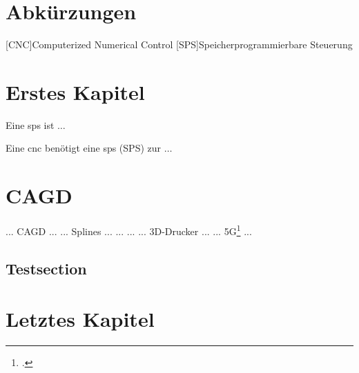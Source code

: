\documentclass[12pt,a4paper]{scrbook}
\begin{document}
\tableofcontents
\cleardoublepage

\listoffigures
\cleardoublepage

\listoftables
\cleardoublepage
 
\printnomenclature
\cleardoublepage
 

 
\chapter*{Abkürzungen}
\begin{acronym}
     [CNC]{Computerized Numerical Control}
     [SPS]{Speicherprogrammierbare Steuerung}
\end{acronym}
\cleardoublepage
 

\chapter{Erstes Kapitel}
Eine \ac{sps} ist $\ldots$

Eine \ac{cnc} benötigt eine \ac{sps}  (SPS)  zur $\ldots$

\chapter{CAGD}
... CAGD \cite{Farin2001} ...
... Splines ... \cite{DIN66025}
... \cite{Farouki2017} ...
... 3D-Drucker ... \cite{Patent3D}
... 5G\footcite{Zafeiropoulos2020} ...

\section{Testsection}
\blindtext
\blindtext
\blindtext
 
\chapter{Letztes Kapitel}
 
\blindtext
\cleardoublepage

\printbibliography
\cleardoublepage

\renewcommand{\indexname}{Stichwortverzeichnis}
\printindex
\end{document}
